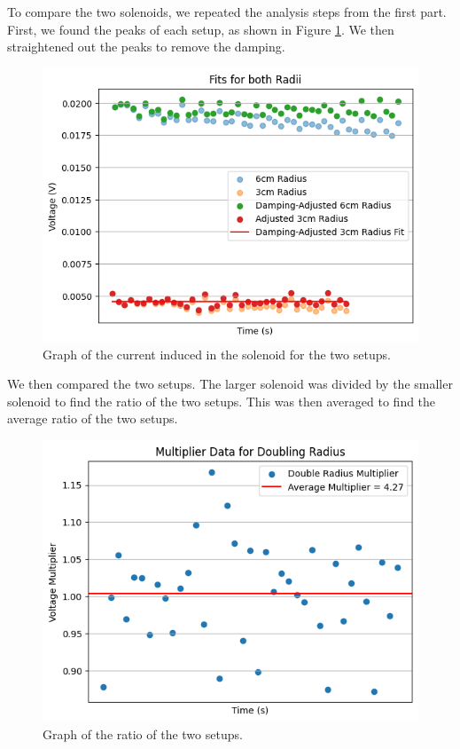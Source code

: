 \documentclass[11pt]{article}
\begin{document}
    To compare the two solenoids, we repeated the analysis steps from the first part.
    First, we found the peaks of each setup, as shown in Figure \ref{fig:part2_peaks}.
    We then straightened out the peaks to remove the damping.

    \begin{figure}[H]
        \centering
        \includegraphics[width=0.8\linewidth]{resources/images/part2 damping}
        \caption{Graph of the current induced in the solenoid for the two setups.}
        \label{fig:part2_peaks}
    \end{figure}

    We then compared the two setups.
    The larger solenoid was divided by the smaller solenoid to find the ratio of the two setups.
    This was then averaged to find the average ratio of the two setups.

    \begin{figure}[H]
        \centering
        \includegraphics[width=0.8\linewidth]{resources/images/part2 ratios}
        \caption{Graph of the ratio of the two setups.}
        \label{fig:part2_ratios}
    \end{figure}
\end{document}
